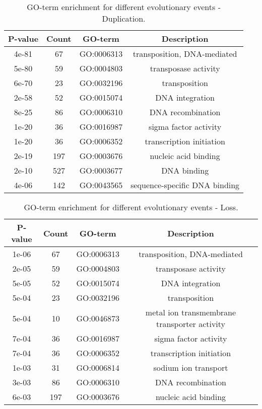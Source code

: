 \documentclass[english]{article}
\begin{document}
%
\begin{table}
\caption{\label{tab:go-events}GO-term enrichment for different
evolutionary events - Duplication.}
\begin{tabular}{cccc}
\hline 
P-value & Count & GO-term & Description \\
\hline 
4e-81 &  67 & GO:0006313 & transposition, DNA-mediated\\
5e-80 &  59 & GO:0004803 & transposase activity\\
6e-70 &  23 & GO:0032196 & transposition\\
2e-58 &  52 & GO:0015074 & DNA integration\\
8e-25 &  86 & GO:0006310 & DNA recombination\\
1e-20 &  36 & GO:0016987 & sigma factor activity\\
1e-20 &  36 & GO:0006352 & transcription initiation\\
2e-19 & 197 & GO:0003676 & nucleic acid binding\\
2e-10 & 527 & GO:0003677 & DNA binding\\
4e-06 & 142 & GO:0043565 & sequence-specific DNA binding\\
\hline 
\end{tabular}
\end{table}
\clearpage{}

%
\begin{table}
\caption{\label{tab:go-events}GO-term enrichment for different
evolutionary events - Loss.}
\begin{tabular}{cccc}
\hline 
P-value & Count & GO-term & Description \\
\hline 
1e-06 &  67 & GO:0006313 & transposition, DNA-mediated\\
2e-05 &  59 & GO:0004803 & transposase activity\\
5e-05 &  52 & GO:0015074 & DNA integration\\
5e-04 &  23 & GO:0032196 & transposition\\
5e-04 &  10 & GO:0046873 & metal ion transmembrane transporter activity\\
7e-04 &  36 & GO:0016987 & sigma factor activity\\
7e-04 &  36 & GO:0006352 & transcription initiation\\
1e-03 &  31 & GO:0006814 & sodium ion transport\\
3e-03 &  86 & GO:0006310 & DNA recombination\\
6e-03 & 197 & GO:0003676 & nucleic acid binding\\
\hline 
\end{tabular}
\end{table}
\clearpage{}
\end{document}
